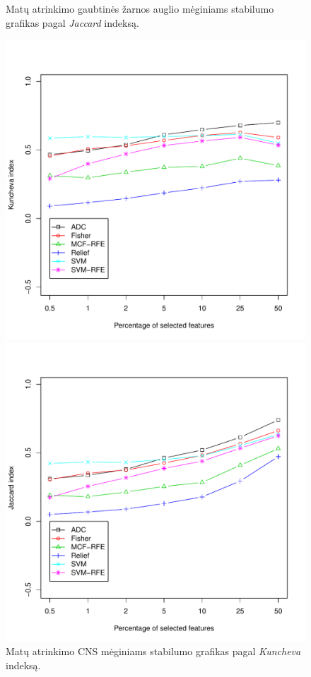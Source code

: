 \begin{figure}[H]
\begin{minipage}[b]{0.47\linewidth}
\caption{Matų atrinkimo gaubtinės žarnos auglio mėginiams stabilumo grafikas pagal \textit{Jaccard} indeksą.}
\label{fig:robj_colon}
\end{minipage}
\hspace{0.2cm}
\begin{minipage}[b]{0.47\linewidth}
\centering
\includegraphics[width=.85\textwidth]{../bachelor/images/nncns_robustness_kuncheva.pdf}
\caption{Matų atrinkimo CNS mėginiams stabilumo grafikas pagal \textit{Kuncheva} indeksą.}
\label{fig:robk_cns}
\end{minipage}
\hspace{0.2cm}
\begin{minipage}[b]{0.47\linewidth}
\centering
\includegraphics[width=.85\textwidth]{../bachelor/images/nncns_robustness_jaccard.pdf}

\end{minipage}
\end{figure}
